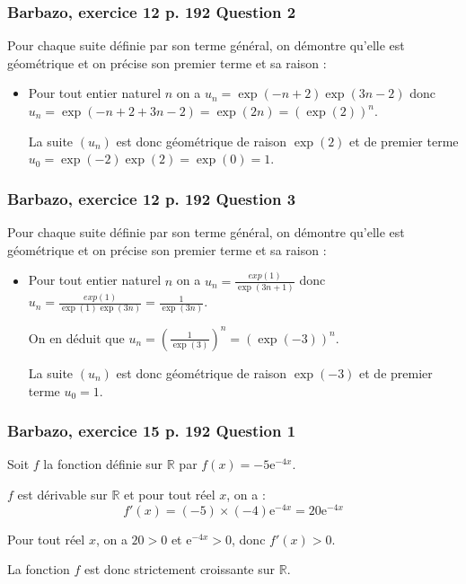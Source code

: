 \documentclass[11pt, hyperref={urlcolor=red,%
            linkcolor=blue, %
            colorlinks=true}]{beamer}
\newcommand{\R}{\mathbb{R}}
\begin{document}
\begin{frame}
\frametitle{Barbazo, exercice 12 p. 192 Question 2}
\label{exo12}
Pour chaque suite définie par son terme général, on démontre qu'elle est géométrique et on précise son premier terme et sa raison :

\begin{itemize}

	
	\item Pour tout entier naturel $n$ on a $u_{n}=\exp(-n+2)\exp(3n-2)$ donc $u_{n}=\exp(-n+2+3n-2)=\exp(2n)=\left(\exp(2)\right)^{n}$.
	
	La suite $\left(u_{n}\right)$ est donc géométrique de raison $\exp(2)$ et de premier terme $u_{0}=\exp(-2)\exp(2)=\exp(0)=1$.
	
		
	
	
\end{itemize}


\end{frame}


\begin{frame}
\frametitle{Barbazo, exercice 12 p. 192 Question 3}
\label{exo12}
Pour chaque suite définie par son terme général, on démontre qu'elle est géométrique et on précise son premier terme et sa raison :

\begin{itemize}

	
		\item Pour tout entier naturel $n$ on a $u_{n}=\frac{exp(1)}{\exp(3n+1)}$ donc  $u_{n}=\frac{exp(1)}{\exp(1)\exp(3n)}=\frac{1}{\exp(3n)}$.
		
On en déduit que  $u_{n}=\left(\frac{1}{\exp(3)}\right)^{n}=\left(\exp(-3)\right)^{n}$.
	
	La suite $\left(u_{n}\right)$ est donc géométrique de raison $\exp(-3)$ et de premier terme $u_{0}=1$.
	
	
	
\end{itemize}


\end{frame}

\begin{frame}
\frametitle{Barbazo, exercice 15 p. 192 Question 1}
\label{exo15}

Soit $f$ la fonction définie sur $\R$ par $f(x)=-5\text{e}^{-4x}$.

$f$ est dérivable sur $\R$ et pour tout réel $x$, on a :
\begin{equation*}
f'(x)=(-5)\times(-4)\text{e}^{-4x}=20\text{e}^{-4x}
\end{equation*}


Pour tout réel $x$, on a $20>0$ et $\text{e}^{-4x}>0$, donc $f'(x)>0$.

La fonction $f$ est donc strictement croissante sur $\R$.
\end{frame}
\end{document}
